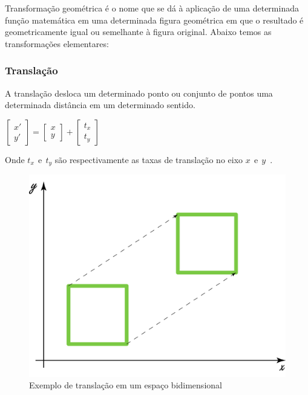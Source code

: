 \documentclass[9pt, a4paper, nofonttune, journal]{IEEEtran}
\begin{document}
Transformação geométrica é o nome que se dá à aplicação de uma determinada função matemática em uma determinada figura geométrica em que o resultado é geometricamente igual ou semelhante à figura original. Abaixo temos as transformações elementares:

\subsubsection{Translação}
A translação desloca um determinado ponto ou conjunto de pontos uma determinada distância em um determinado sentido.

\begin{center}
$\begin{bmatrix}x'\\
y'
\end{bmatrix}=\begin{bmatrix}x\\
y
\end{bmatrix}+\begin{bmatrix}t_{x}\\
t_{y}
\end{bmatrix}$\end{center}
Onde $t_{x}~~ \textrm{e} ~~ t_{y}$ são respectivamente as taxas de translação no eixo $x~~ \textrm{e} ~~y$~\cite{CGPPBook1}.

\begin{figure}[H]
\begin{center}
\includegraphics[scale=0.25]{figuras/translation1}
\caption{Exemplo de translação em um espaço bidimensional}
\end{center}
\end{figure}
\end{document}
